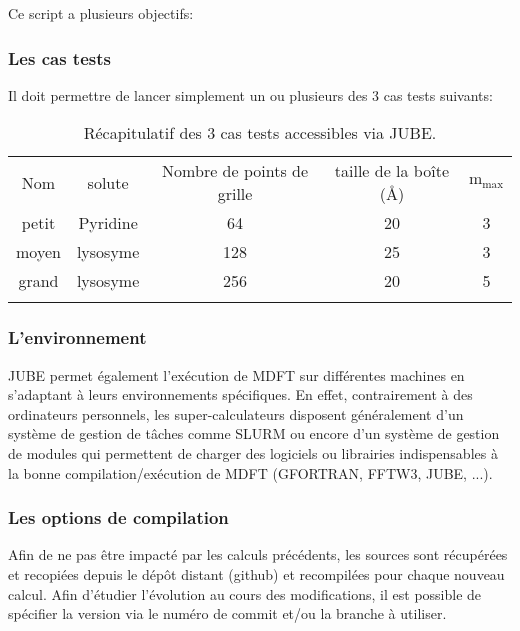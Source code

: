 Ce script a plusieurs objectifs:


\subsubsection{Les cas tests}
Il doit permettre de lancer simplement un ou plusieurs des 3 cas tests suivants:

\begin{table}[ht]
  \begin{center}
    \begin{tabular}{c c c c c}
      \hline & \\[-1em]\hline
      Nom & solute & Nombre de points de grille & taille de la boîte (\AA) & $\mathrm{m}_\mathrm{max}$  \\
      \hline
      petit & Pyridine & 64 & 20 & 3  \\
      moyen & lysosyme & 128 & 25 & 3  \\
      grand & lysosyme & 256 & 20 & 5  \\
      \hline & \\[-1em]\hline%
    \end{tabular}
  \end{center}
  \caption{Récapitulatif des 3 cas tests accessibles via JUBE.}
  \label{tab:JUBE_bench_cases}  
\end{table}


\subsubsection{L'environnement}
JUBE permet également l’exécution de MDFT sur différentes machines en s'adaptant à leurs environnements spécifiques. En effet, contrairement à des ordinateurs personnels, les super-calculateurs disposent généralement d'un système de gestion de tâches comme SLURM ou encore d'un système de gestion de modules qui permettent de charger des logiciels ou librairies indispensables à la bonne compilation/exécution de MDFT (GFORTRAN, FFTW3, JUBE, ...).


\subsubsection{Les options de compilation}
Afin de ne pas être impacté par les calculs précédents, les sources sont récupérées et recopiées depuis le dépôt distant (github) et recompilées pour chaque nouveau calcul. Afin d'étudier l'évolution au cours des modifications, il est possible de spécifier la version via le numéro de commit et/ou la branche à utiliser.

